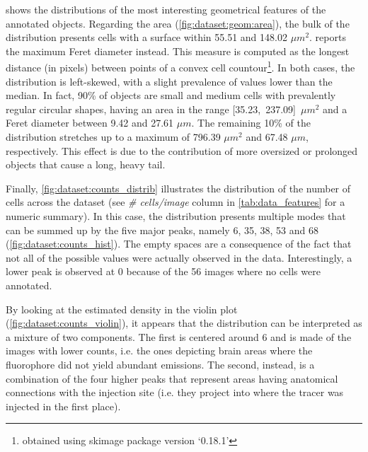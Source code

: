 shows the distributions of the most interesting geometrical features of the annotated objects.
Regarding the area (\cref{fig:dataset:geom:area}), the bulk of the distribution presents cells with a surface within 55.51 and 148.02  $\mu m^2$.
 reports the maximum Feret diameter \cite{merkus2009particle} instead. This measure is computed as the longest distance (in pixels) between points of a convex cell countour\footnote{obtained using skimage package version `0.18.1'}.
In both cases, the distribution is left-skewed, with a slight prevalence of values lower than the median.
In fact, 90\% of objects are small and medium cells with prevalently regular circular shapes, having an area in the range \mbox{[35.23, 237.09]  $\mu m^2$} and a Feret diameter between 9.42 and 27.61  $\mu m$.
The remaining 10\% of the distribution stretches up to a maximum of 796.39  $\mu m^2$ and 67.48 $\mu m$, respectively.
This effect is due to the contribution of more oversized or prolonged objects that cause a long, heavy tail.

Finally, \ref{fig:dataset:counts_distrib} illustrates the distribution of the number of cells across the dataset (see \textit{\# cells/image} column in \cref{tab:data_features} for a numeric summary).
In this case, the distribution presents multiple modes that can be summed up by the five major peaks, namely 6, 35, 38, 53 and 68
(\cref{fig:dataset:counts_hist}).
The empty spaces are a consequence of the fact that not all of the possible values were actually observed in the data.
Interestingly, a lower peak is observed at 0 because of the 56 images where no cells were annotated.

By looking at the estimated density in the violin plot (\cref{fig:dataset:counts_violin}), it appears that the distribution can be interpreted as a mixture of two components.
The first is centered around 6 and is made of the images with lower counts, i.e. the ones depicting brain areas where the fluorophore did not yield abundant emissions.
The second, instead, is a combination of the four higher peaks that represent %
areas having anatomical connections with the injection site (i.e. they project into where the tracer was injected in the first place).

